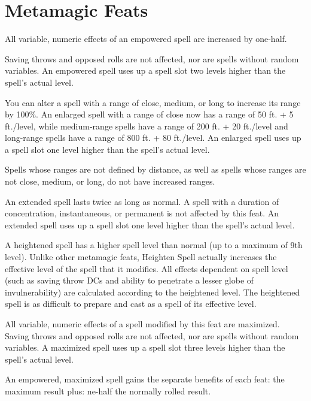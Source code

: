 \section{Metamagic Feats}

{All variable, numeric effects of an empowered spell are increased by one-half.

Saving throws and opposed rolls are not affected, nor are spells without random variables. An empowered spell uses up a spell slot two levels higher than the spell’s actual level.}

{You can alter a spell with a range of close, medium, or long to increase its range by 100\%. An enlarged spell with a range of close now has a range of 50 ft. + 5 ft./level, while medium-range spells have a range of 200 ft. + 20 ft./level and long-range spells have a range of 800 ft. + 80 ft./level. An enlarged spell uses up a spell slot one level higher than the spell’s actual level.

Spells whose ranges are not defined by distance, as well as spells whose ranges are not close, medium, or long, do not have increased ranges.}

{An extended spell lasts twice as long as normal. A spell with a duration of concentration, instantaneous, or permanent is not affected by this feat. An extended spell uses up a spell slot one level higher than the spell’s actual level.}

{A heightened spell has a higher spell level than normal (up to a maximum of 9th level). Unlike other metamagic feats, Heighten Spell actually increases the effective level of the spell that it modifies. All effects dependent on spell level (such as saving throw DCs and ability to penetrate a lesser globe of invulnerability) are calculated according to the heightened level. The heightened spell is as difficult to prepare and cast as a spell of its effective level.}

{All variable, numeric effects of a spell modified by this feat are maximized. Saving throws and opposed rolls are not affected, nor are spells without random variables. A maximized spell uses up a spell slot three levels higher than the spell’s actual level.

An empowered, maximized spell gains the separate benefits of each feat: the maximum result plus:  ne-half the normally rolled result.}

